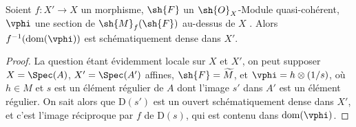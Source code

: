 \begin{proposition}[20.2.15]
\label{IV.20.2.15}
Soient $f:X'\to X$ un morphisme, $\sh{F}$ un $\sh{O}_X$-Module quasi-cohérent, $\vphi$ une section de $\sh{M}_f(\sh{F})$ au-dessus de $X$ .
Alors $f^{-1}(\operatorname{dom}(\vphi))$ est schématiquement dense dans $X'$.
\end{proposition}

\begin{proof}
La question étant évidemment locale sur $X$ et $X'$, on peut supposer $X=\Spec(A)$, $X'=\Spec(A')$ affines, $\sh{F}=\widetilde{M}$, et $\vphi=h\otimes(1/s)$, où $h\in M$ et $s$ est un élément régulier de $A$ dont l'image $s'$ dans $A'$ est un élément régulier.
On sait alors  que $\mathrm{D}(s')$ est un ouvert schématiquement dense dans $X'$, et c'est l'image réciproque par $f$ de $\mathrm{D}(s)$, qui est contenu dans $\operatorname{dom}(\vphi)$.
\end{proof}

